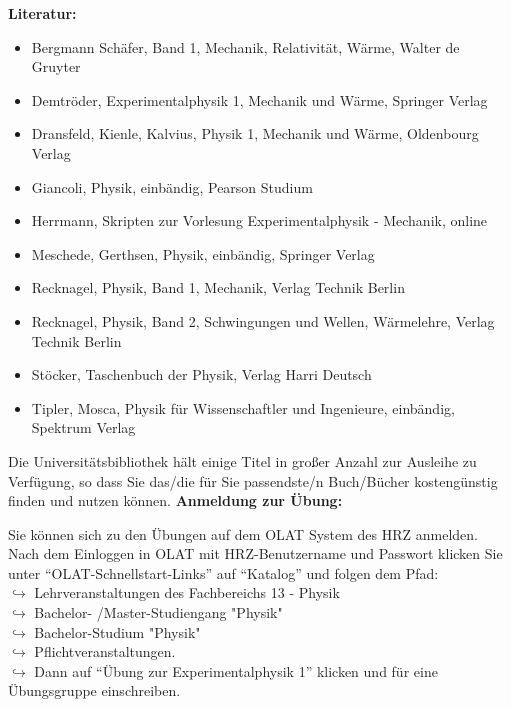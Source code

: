 \noindent
\textbf{Literatur:}
\begin{itemize}
  \item Bergmann Schäfer, Band 1, Mechanik, Relativität, Wärme, Walter de Gruyter
  \item Demtröder, Experimentalphysik 1, Mechanik und Wärme, Springer Verlag
  \item Dransfeld, Kienle, Kalvius, Physik 1, Mechanik und Wärme, Oldenbourg Verlag
  \item Giancoli, Physik, einbändig, Pearson Studium
  \item Herrmann, Skripten zur Vorlesung Experimentalphysik - Mechanik, online
  \item Meschede, Gerthsen, Physik, einbändig, Springer Verlag
  \item Recknagel, Physik, Band 1, Mechanik, Verlag Technik Berlin
  \item Recknagel, Physik, Band 2, Schwingungen und Wellen, Wärmelehre, Verlag Technik Berlin
  \item Stöcker, Taschenbuch der Physik, Verlag Harri Deutsch   
  \item Tipler, Mosca, Physik für Wissenschaftler und Ingenieure, einbändig, Spektrum Verlag
\end{itemize}

Die Universitätsbibliothek hält einige Titel in großer Anzahl zur Ausleihe zu Verfügung, so dass Sie das/die für Sie passendste/n Buch/Bücher kostengünstig finden und nutzen können.
\noindent
\textbf{Anmeldung zur Übung:}

Sie können sich zu den Übungen auf dem OLAT System des HRZ anmelden.
Nach dem Einloggen in OLAT mit HRZ-Benutzername und Passwort klicken Sie unter "`OLAT-Schnellstart-Links"' auf "`Katalog"' und folgen dem Pfad:\\
$\hookrightarrow$ Lehrveranstaltungen des Fachbereichs 13 - Physik\\
$\hookrightarrow$ Bachelor- /Master-Studiengang "Physik"\\
$\hookrightarrow$ Bachelor-Studium "Physik"\\
$\hookrightarrow$ Pflichtveranstaltungen.\\
$\hookrightarrow$ Dann auf "`Übung zur Experimentalphysik 1"' klicken und für eine Übungsgruppe einschreiben.


